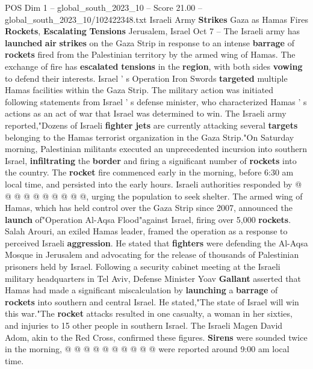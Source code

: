 \begin{textsample}{POS Dim 1 – global\_south\_2023\_10 – Score 21.00 – global\_south\_2023\_10/102422348.txt}  \label{ex:f1_pos_054}
Israeli Army \textbf{Strikes} Gaza as Hamas Fires \textbf{Rockets}, \textbf{Escalating} \textbf{Tensions} Jerusalem, Israel Oct 7 -- The Israeli army has \textbf{launched} \textbf{air} \textbf{strikes} on the Gaza Strip in response to an intense \textbf{barrage} of \textbf{rockets} fired from the Palestinian territory by the armed wing of Hamas.
The exchange of fire has \textbf{escalated} \textbf{tensions} in the \textbf{region}, with both sides \textbf{vowing} to defend their interests.
Israel ' s Operation Iron Swords \textbf{targeted} multiple Hamas facilities within the Gaza Strip.
The military action was initiated following statements from Israel ' s defense minister, who characterized Hamas ' s actions as an act of war that Israel was determined to win.
The Israeli army reported,"Dozens of Israeli \textbf{fighter} \textbf{jets} are currently attacking several \textbf{targets} belonging to the Hamas terrorist organization in the Gaza Strip."On Saturday morning, Palestinian militants executed an unprecedented incursion into southern Israel, \textbf{infiltrating} the \textbf{border} and firing a significant number of \textbf{rockets} into the country.
The \textbf{rocket} fire commenced early in the morning, before 6:30 am local time, and persisted into the early hours.
Israeli authorities responded by @ @ @ @ @ @ @ @ @ @, urging the population to seek shelter.
The armed wing of Hamas, which has held control over the Gaza Strip since 2007, announced the \textbf{launch} of"Operation Al-Aqsa Flood"against Israel, firing over 5,000 \textbf{rockets}.
Salah Arouri, an exiled Hamas leader, framed the operation as a response to perceived Israeli \textbf{aggression}.
He stated that \textbf{fighters} were defending the Al-Aqsa Mosque in Jerusalem and advocating for the release of thousands of Palestinian prisoners held by Israel.
Following a security cabinet meeting at the Israeli military headquarters in Tel Aviv, Defense Minister Yoav \textbf{Gallant} asserted that Hamas had made a significant miscalculation by \textbf{launching} a \textbf{barrage} of \textbf{rockets} into southern and central Israel.
He stated,"The state of Israel will win this war."The \textbf{rocket} attacks resulted in one casualty, a woman in her sixties, and injuries to 15 other people in southern Israel.
The Israeli Magen David Adom, akin to the Red Cross, confirmed these figures. \textbf{Sirens} were sounded twice in the morning, @ @ @ @ @ @ @ @ @ @ were reported around 9:00 am local time.

\end{textsample}

